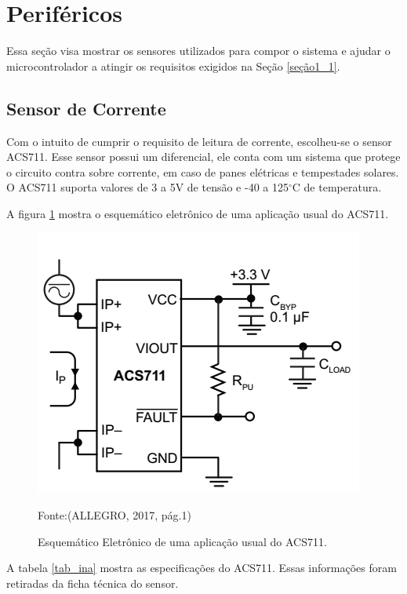 \section{Periféricos}

	Essa seção visa mostrar os sensores utilizados para compor o sistema e ajudar o microcontrolador a atingir os requisitos exigidos na Seção \ref{seção1_1}.

\subsection{Sensor de Corrente}

Com o intuito de cumprir o requisito de leitura de corrente, escolheu-se o sensor ACS711. Esse sensor possui um diferencial, ele conta com um sistema que protege o circuito contra sobre corrente, em caso de panes elétricas e tempestades solares. O ACS711 suporta valores de 3 a 5V de tensão e -40 a 125$^{\circ}$C de temperatura.

A figura \ref{fig20} mostra o esquemático eletrônico de uma aplicação usual do ACS711.



\begin{figure}[h]
	\centering
    \caption{Esquemático Eletrônico de uma aplicação usual do ACS711.}
    
	\includegraphics[keepaspectratio=true,scale=0.5]{figuras/currentSensor.PNG}
	
	Fonte:(ALLEGRO, 2017, pág.1)\linebreak
	
	\label{fig20}
\end{figure}

A tabela \ref{tab_ina} mostra as especificações do ACS711. Essas informações foram retiradas da ficha técnica do sensor.

